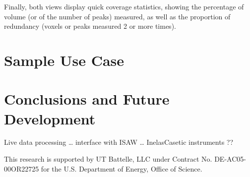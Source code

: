 \documentclass{iucr}              %
\begin{document}
Finally, both views display quick coverage statistics, showing the percentage of
volume (or of the number of peaks) measured, as well as the proportion of
redundancy (voxels or peaks measured 2 or more times).     

\section{Sample Use Case}


\section{Conclusions and Future Development}


Live data processing    …  interface with ISAW … InelasCasetic instruments ??

























This research is supported by UT Battelle, LLC under Contract No.
DE-AC05-00OR22725 for the U.S. Department of Energy, Office of Science.



\end{document}
